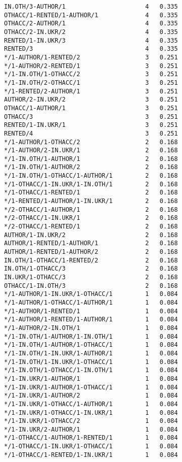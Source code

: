 \documentclass[
  letterpaper,
  DIV=11,
  numbers=noendperiod]{scrreprt}
\begin{document}
\begin{verbatim}
IN.OTH/3-AUTHOR/1                      4   0.335
OTHACC/1-RENTED/1-AUTHOR/1             4   0.335
OTHACC/2-AUTHOR/1                      4   0.335
OTHACC/2-IN.UKR/2                      4   0.335
RENTED/1-IN.UKR/3                      4   0.335
RENTED/3                               4   0.335
*/1-AUTHOR/1-RENTED/2                  3   0.251
*/1-AUTHOR/2-RENTED/1                  3   0.251
*/1-IN.OTH/1-OTHACC/2                  3   0.251
*/1-IN.OTH/2-OTHACC/1                  3   0.251
*/1-RENTED/2-AUTHOR/1                  3   0.251
AUTHOR/2-IN.UKR/2                      3   0.251
OTHACC/1-AUTHOR/1                      3   0.251
OTHACC/3                               3   0.251
RENTED/1-IN.UKR/1                      3   0.251
RENTED/4                               3   0.251
*/1-AUTHOR/1-OTHACC/2                  2   0.168
*/1-AUTHOR/2-IN.UKR/1                  2   0.168
*/1-IN.OTH/1-AUTHOR/1                  2   0.168
*/1-IN.OTH/1-AUTHOR/2                  2   0.168
*/1-IN.OTH/1-OTHACC/1-AUTHOR/1         2   0.168
*/1-OTHACC/1-IN.UKR/1-IN.OTH/1         2   0.168
*/1-OTHACC/1-RENTED/1                  2   0.168
*/1-RENTED/1-AUTHOR/1-IN.UKR/1         2   0.168
*/2-OTHACC/1-AUTHOR/1                  2   0.168
*/2-OTHACC/1-IN.UKR/1                  2   0.168
*/2-OTHACC/1-RENTED/1                  2   0.168
AUTHOR/1-IN.UKR/2                      2   0.168
AUTHOR/1-RENTED/1-AUTHOR/1             2   0.168
AUTHOR/1-RENTED/1-AUTHOR/2             2   0.168
IN.OTH/1-OTHACC/1-RENTED/2             2   0.168
IN.OTH/1-OTHACC/3                      2   0.168
IN.UKR/1-OTHACC/3                      2   0.168
OTHACC/1-IN.OTH/3                      2   0.168
*/1-AUTHOR/1-IN.UKR/1-OTHACC/1         1   0.084
*/1-AUTHOR/1-OTHACC/1-AUTHOR/1         1   0.084
*/1-AUTHOR/1-RENTED/1                  1   0.084
*/1-AUTHOR/1-RENTED/1-AUTHOR/1         1   0.084
*/1-AUTHOR/2-IN.OTH/1                  1   0.084
*/1-IN.OTH/1-AUTHOR/1-IN.OTH/1         1   0.084
*/1-IN.OTH/1-AUTHOR/1-OTHACC/1         1   0.084
*/1-IN.OTH/1-IN.UKR/1-AUTHOR/1         1   0.084
*/1-IN.OTH/1-IN.UKR/1-OTHACC/1         1   0.084
*/1-IN.OTH/1-OTHACC/1-IN.OTH/1         1   0.084
*/1-IN.UKR/1-AUTHOR/1                  1   0.084
*/1-IN.UKR/1-AUTHOR/1-OTHACC/1         1   0.084
*/1-IN.UKR/1-AUTHOR/2                  1   0.084
*/1-IN.UKR/1-OTHACC/1-AUTHOR/1         1   0.084
*/1-IN.UKR/1-OTHACC/1-IN.UKR/1         1   0.084
*/1-IN.UKR/1-OTHACC/2                  1   0.084
*/1-IN.UKR/2-AUTHOR/1                  1   0.084
*/1-OTHACC/1-AUTHOR/1-RENTED/1         1   0.084
*/1-OTHACC/1-IN.UKR/1-OTHACC/1         1   0.084
*/1-OTHACC/1-RENTED/1-IN.UKR/1         1   0.084

\end{verbatim}
\end{document}
